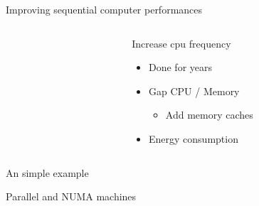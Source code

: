 \documentclass[xcolor={usenames,dvipsnames},hyperref={pdfusetitle}]{beamer}
\makeatletter
\newcommand{\alertitem}{\item<+-|alert@+>}
\makeatother
\begin{document}
\begin{frame}{Improving sequential computer performances}
    \begin{columns}
        \begin{column}{.45\textwidth}
            \centering
            
        \end{column}
        \begin{column}{.45\textwidth}
            \pause
            \begin{block}{Increase cpu frequency}
                \begin{itemize}[<+->]
                    \item Done for years
                    \alertitem Gap CPU / Memory
                    \begin{itemize}
                        \alertitem Add memory caches
                    \end{itemize}
                    \alertitem Energy consumption
                \end{itemize}
            \end{block}
        \end{column}
    \end{columns}
\end{frame}

\begin{frame}{An simple example}
    \centering
    \scalebox{.6}{
        
    }
\end{frame}

\begin{frame}{Parallel and NUMA machines}
    \centering
    \scalebox{.6}{
        
    }
    \pause
\end{frame}
\end{document}

